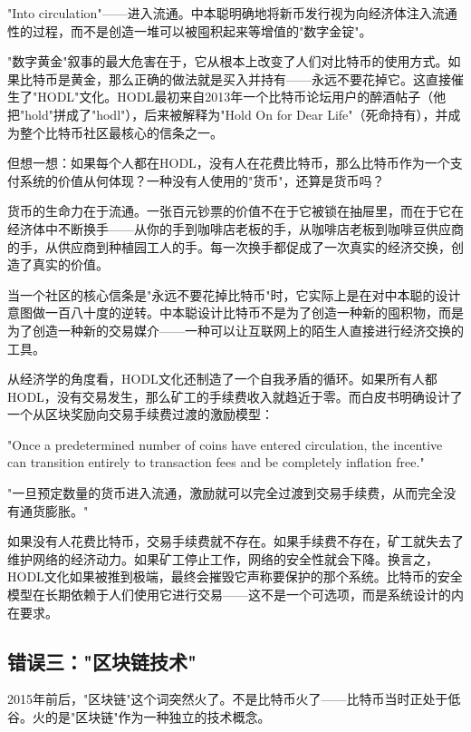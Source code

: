 \documentclass[a4paper,12pt,openany]{ctexbook}
\newenvironment{quoting}{%
  \par\vspace{0.5em}%
  \begin{list}{}{%
    \setlength{\leftmargin}{2em}%
    \setlength{\rightmargin}{2em}%
    \setlength{\parsep}{0.3em}%
    \setlength{\itemsep}{0pt}%
    \setlength{\topsep}{0pt}%
  }%
  \item\relax
}{%
  \end{list}%
  \par\vspace{0.5em}%
}
\begin{document}
"Into circulation"——进入流通。中本聪明确地将新币发行视为向经济体注入流通性的过程，而不是创造一堆可以被囤积起来等增值的"数字金锭"。

"数字黄金"叙事的最大危害在于，它从根本上改变了人们对比特币的使用方式。如果比特币是黄金，那么正确的做法就是买入并持有——永远不要花掉它。这直接催生了"HODL"文化。HODL最初来自2013年一个比特币论坛用户的醉酒帖子（他把"hold"拼成了"hodl"），后来被解释为"Hold On for Dear Life"（死命持有），并成为整个比特币社区最核心的信条之一。

但想一想：如果每个人都在HODL，没有人在花费比特币，那么比特币作为一个支付系统的价值从何体现？一种没有人使用的"货币"，还算是货币吗？

货币的生命力在于流通。一张百元钞票的价值不在于它被锁在抽屉里，而在于它在经济体中不断换手——从你的手到咖啡店老板的手，从咖啡店老板到咖啡豆供应商的手，从供应商到种植园工人的手。每一次换手都促成了一次真实的经济交换，创造了真实的价值。

当一个社区的核心信条是"永远不要花掉比特币"时，它实际上是在对中本聪的设计意图做一百八十度的逆转。中本聪设计比特币不是为了创造一种新的囤积物，而是为了创造一种新的交易媒介——一种可以让互联网上的陌生人直接进行经济交换的工具。

从经济学的角度看，HODL文化还制造了一个自我矛盾的循环。如果所有人都HODL，没有交易发生，那么矿工的手续费收入就趋近于零。而白皮书明确设计了一个从区块奖励向交易手续费过渡的激励模型：


\begin{quoting}
\small
"Once a predetermined number of coins have entered circulation, the incentive can transition entirely to transaction fees and be completely inflation free."

"一旦预定数量的货币进入流通，激励就可以完全过渡到交易手续费，从而完全没有通货膨胀。"
\end{quoting}


如果没有人花费比特币，交易手续费就不存在。如果手续费不存在，矿工就失去了维护网络的经济动力。如果矿工停止工作，网络的安全性就会下降。换言之，HODL文化如果被推到极端，最终会摧毁它声称要保护的那个系统。比特币的安全模型在长期依赖于人们使用它进行交易——这不是一个可选项，而是系统设计的内在要求。


\subsection*{错误三："区块链技术"}


2015年前后，"区块链"这个词突然火了。不是比特币火了——比特币当时正处于低谷。火的是"区块链"作为一种独立的技术概念。
\end{document}
